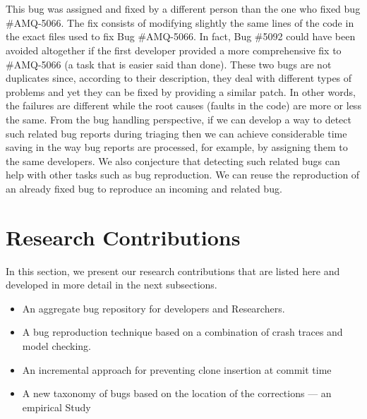 \\ \\
This bug was assigned and fixed by a different person than the one who fixed bug \#AMQ-5066.
The fix consists of modifying slightly the same lines of the code in the exact files used to fix Bug \#AMQ-5066.
In fact, Bug \#5092 could have been avoided altogether if the first developer provided a more comprehensive fix to \#AMQ-5066 (a task that is easier said than done).
These two bugs are not duplicates since, according to their description, they deal with different types of problems and yet they can be fixed by providing a similar patch.
In other words, the failures are different while the root causes (faults in the code) are more or less the same.
From the bug handling perspective, if we can develop a way to detect such related bug reports during triaging then we can achieve considerable time saving in the way bug reports are processed, for example, by assigning them to the same developers.
We also conjecture that detecting such related bugs can help with other tasks such as bug reproduction.
We can  reuse the reproduction of an already fixed bug to reproduce an incoming and related bug.

\section{Research Contributions\label{sec:objective-thesis}}

In this section, we present our research contributions that are listed here and developed in more detail in the next subsections.

\begin{itemize}
	\item An aggregate bug  repository for  developers  and  Researchers.
	\item A bug reproduction technique based on a combination of crash traces and model checking.
	\item An incremental approach for preventing clone insertion at commit time
	\item A new taxonomy of bugs based on the location of the corrections --- an empirical Study
\end{itemize}

